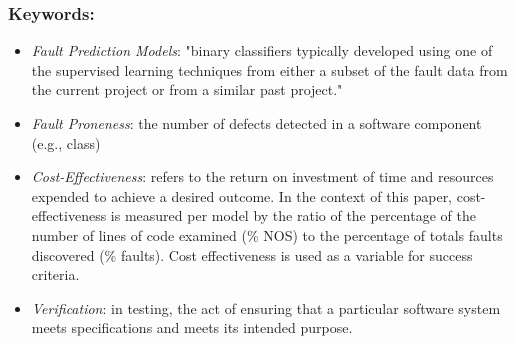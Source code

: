 \documentclass{sig-alternate-05-2015}
\begin{document}
\subsubsection{Keywords:}
\begin{itemize}
\item \emph{Fault Prediction Models}: "binary classifiers typically developed using one of the supervised learning techniques from either a subset of the fault data from the current project or from a similar past project." \cite{Yue:2009}
\item \emph{Fault Proneness}: the number of defects detected in a software component (e.g., class)
\item \emph{Cost-Effectiveness}: refers to the return on investment of time and resources expended to achieve a desired outcome. In the context of this paper, cost-effectiveness is measured per model by the ratio of the percentage of the number of lines of code examined (\% NOS) to the percentage of totals faults discovered (\% faults). Cost effectiveness is used as a variable for success criteria.
\item \emph{Verification}: in testing, the act of ensuring that a particular software system meets specifications and meets its intended purpose.
\end{itemize} 
\end{document}
